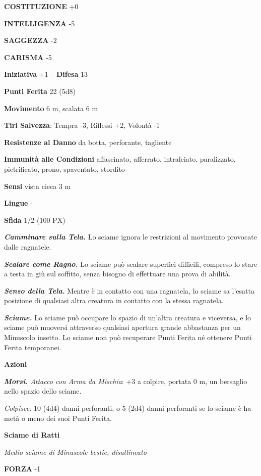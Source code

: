 \begin{multicols}{2}
	\textbf{COSTITUZIONE} +0

	\textbf{INTELLIGENZA} -5

	\textbf{SAGGEZZA} -2

	\textbf{CARISMA} -5

	\textbf{Iniziativa} +1 -- \textbf{Difesa} 13

	\textbf{Punti Ferita} 22 (5d8)

	\textbf{Movimento} 6 m, scalata 6 m

	\textbf{Tiri Salvezza}: Tempra -3, Riflessi +2, Volontà -1

	\textbf{Resistenze al Danno} da botta, perforante, tagliente

	\textbf{Immunità alle Condizioni} affascinato, afferrato, intralciato, paralizzato, pietrificato, prono, spaventato, stordito

	\textbf{Sensi} vista cieca 3 m

	\textbf{Lingue} -

	\textbf{Sfida} 1/2 (100 PX)

	\textit{\textbf{Camminare sulla Tela.}} Lo sciame ignora le restrizioni al movimento provocate dalle ragnatele.

	\textit{\textbf{Scalare come Ragno.}} Lo sciame può scalare superfici difficili, compreso lo stare a testa in giù sul soffitto, senza bisogno di effettuare una prova di abilità.

	\textit{\textbf{Senso della Tela.}} Mentre è in contatto con una ragnatela, lo sciame sa l'esatta posizione di qualsiasi altra creatura in contatto con la stessa ragnatela.

	\textit{\textbf{Sciame.}} Lo sciame può occupare lo spazio di un'altra creatura e viceversa, e lo sciame può muoversi attraverso qualsiasi apertura grande abbastanza per un Minuscolo insetto. Lo sciame non può recuperare Punti Ferita né ottenere Punti Ferita temporanei.

	\textbf{Azioni}

	\textit{\textbf{Morsi.} Attacco con Arma da Mischia}: +3 a colpire, portata 0 m, un bersaglio nello spazio dello sciame.

	\textit{Colpisce:} 10 (4d4) danni perforanti, o 5 (2d4) danni perforanti se lo sciame è ha metà o meno dei suoi Punti Ferita.

	\medskip\textbf{Sciame di Ratti}

	\textit{Medio sciame di Minuscole bestie, disallineato}

	\textbf{FORZA} -1


\end{multicols}
